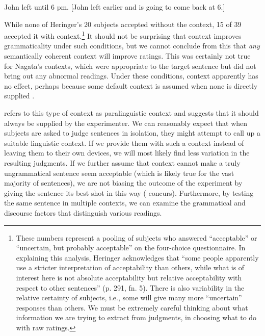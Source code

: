\ea\label{ex:5:6}
John left until 6 pm. [John left earlier and is going to come back at 6.]
\z

\noindent
While none of Heringer's 20 subjects accepted  without the context, 15 of 39 accepted it with context.\footnote{These numbers represent a pooling of subjects who answered ``acceptable'' or ``uncertain, but probably acceptable'' on the four-choice questionnaire. In explaining this analysis, Heringer acknowledges that ``some people apparently use a stricter interpretation of acceptability than others, while what is of interest here is not absolute acceptability but relative acceptability with respect to other sentences'' (p. 291, fn. 5). There is also variability in the relative certainty of subjects, i.e., some will give many more ``uncertain'' responses than others. We must be extremely careful thinking about what information we are trying to extract from judgments, in choosing what to do with raw ratings.}
 It should not be surprising that context improves grammaticality under such conditions, but we cannot conclude from this that \textit{any} semantically coherent context will improve ratings. This was certainly not true for Nagata's contexts, which were appropriate to the target sentence but did not bring out any abnormal readings. Under these conditions, context apparently has no effect, perhaps because some default context is assumed when none is directly supplied \citep{DanksEtAl1971}.



\citet{Snow1975} refers to this type of context as paralinguistic context and suggests that it should always be supplied by the experimenter. We can reasonably expect that when subjects are asked to judge sentences in isolation, they might attempt to call up a suitable linguistic context. If we provide them with such a context instead of leaving them to their own devices, we will most likely find less variation in the resulting judgments. If we further assume that context cannot make a truly ungrammatical sentence seem acceptable (which is likely true for the vast majority of sentences), we are not biasing the outcome of the experiment by giving the sentence its best shot in this way (\citet{Householder1973} concurs). Furthermore, by testing the same sentence in multiple contexts, we can examine the grammatical and discourse factors that distinguish various readings.

